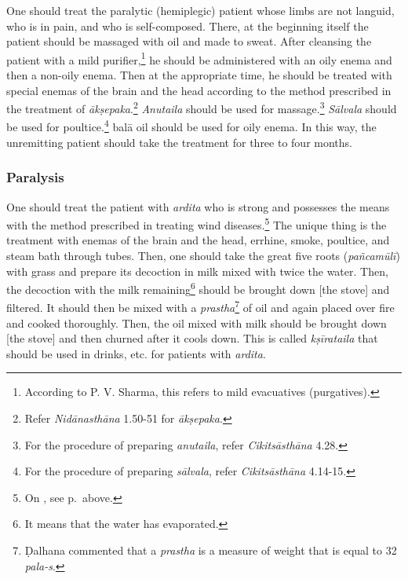 \begin{translation}
\begin{tt}
One should treat the paralytic (hemiplegic) patient whose limbs are
not languid, who is in pain, and who is self-composed. There, at the
beginning itself the patient should be massaged with oil and made to
sweat. After cleansing the patient with a mild
purifier,\footnote{According to P. V. Sharma, this refers to mild
    evacuatives (purgatives).} he should be administered with an oily
    enema and then a non-oily enema. Then at the appropriate time, he
    should be treated with special enemas of the brain and the head
    according to the method prescribed in the treatment of
    \textit{ākṣepaka}.\footnote{Refer \textit{Nidānasthāna} 1.50-51 for
        \textit{ākṣepaka}.} \textit{Anutaila} should be used for
        massage.\footnote{For the procedure of preparing \textit{anutaila},
            refer \textit{Cikitsāsthāna} 4.28.} \textit{Sālvala} should be used
            for poultice.\footnote{For the procedure of preparing
                \textit{sālvala}, refer \textit{Cikitsāsthāna} 4.14-15.} \gls{balā}
                oil should be used for oily enema. In this way, the unremitting patient should take the
                treatment for three to four months.

\item[20]
\item[21]

\subsubsection{Paralysis}

\item[22] One should treat the patient with \textit{ardita} %
who is strong and possesses the means with the method prescribed in
treating wind diseases.\footnote{On , see
    p.\,\pageref{ardita} above.} The unique thing is the treatment with
    enemas of the brain and the head, errhine, smoke, poultice, and steam
    bath through tubes. Then, one should take the great five roots
    (\textit{pañcamūlī}) with grass and prepare its decoction in milk
    mixed with twice the water. Then, the decoction with the milk
    remaining\footnote{It means that the water has evaporated.} should be
        brought down [the stove] and filtered. It should then be mixed with a
        \textit{prastha}\footnote{Ḍalhana commented \citep[425]{vulgate} that
            a \textit{prastha} is a measure of weight that is equal to 32
            \textit{pala-s}.} of oil and again placed over fire and cooked
            thoroughly. Then, the oil mixed with milk should be brought down [the
            stove] and then churned after it cools down. This is called
            \textit{kṣīrataila} that should be used in drinks, etc. for patients
            with \textit{ardita}.


\end{tt}
\end{translation}
